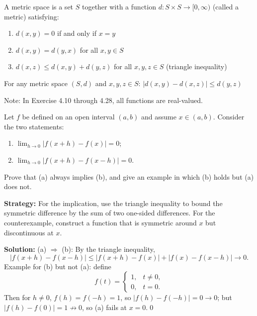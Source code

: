 \begin{definition}
A metric space is a set $S$ together with a function $d: S \times S \to [0,\infty)$ (called a metric) satisfying:
\begin{enumerate}
\item $d(x,y) = 0$ if and only if $x = y$
\item $d(x,y) = d(y,x)$ for all $x,y \in S$
\item $d(x,z) \leq d(x,y) + d(y,z)$ for all $x,y,z \in S$ (triangle inequality)
\end{enumerate}
\end{definition}

\begin{theorem}
For any metric space $(S,d)$ and $x,y,z \in S$: $|d(x,y) - d(x,z)| \leq d(y,z)$
\end{theorem}

Note: In Exercise 4.10 through 4.28, all functions are real-valued.



\begin{problembox}
Let $f$ be defined on an open interval $(a, b)$ and assume $x \in (a, b)$. Consider the two statements:
\begin{enumerate}[label=(\alph*)]
\item $\lim_{h \to 0} |f(x + h) - f(x)| = 0$;
\item $\lim_{h \to 0} |f(x + h) - f(x - h)| = 0$.
\end{enumerate}
Prove that (a) always implies (b), and give an example in which (b) holds but (a) does not.
\end{problembox}

\noindent\textbf{Strategy:} For the implication, use the triangle inequality to bound the symmetric difference by the sum of two one-sided differences. For the counterexample, construct a function that is symmetric around $x$ but discontinuous at $x$.

\bigskip\noindent\textbf{Solution:}
(a) $\Rightarrow$ (b): By the triangle inequality,
\[
|f(x+h)-f(x-h)|\le |f(x+h)-f(x)|+|f(x)-f(x-h)|\to 0.
\]
Example for (b) but not (a): define
\[
f(t)=\begin{cases}
1,& t\ne 0,\\
0,& t=0.
\end{cases}
\]
Then for $h\ne 0$, $f(h)=f(-h)=1$, so $|f(h)-f(-h)|=0\to 0$; but $|f(h)-f(0)|=1\not\to 0$, so (a) fails at $x=0$.\qed



